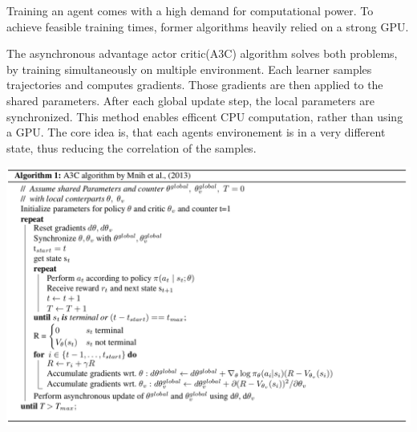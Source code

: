 Training an agent comes with a high demand for computational power. To achieve feasible training times, former algorithms heavily relied on a strong GPU.

The asynchronous advantage actor critic(A3C) algorithm solves both problems, by training simultaneously on multiple environment.
Each learner samples trajectories and computes gradients. Those gradients are then applied to the shared parameters. 
After each global update step, the local parameters are synchronized.
This method enables efficent CPU computation, rather than using a GPU.
The core idea is, that each agents environement is in a very different state, thus reducing the correlation of the samples.
 
\includegraphics[scale=0.3]{bilder/aaac.png}